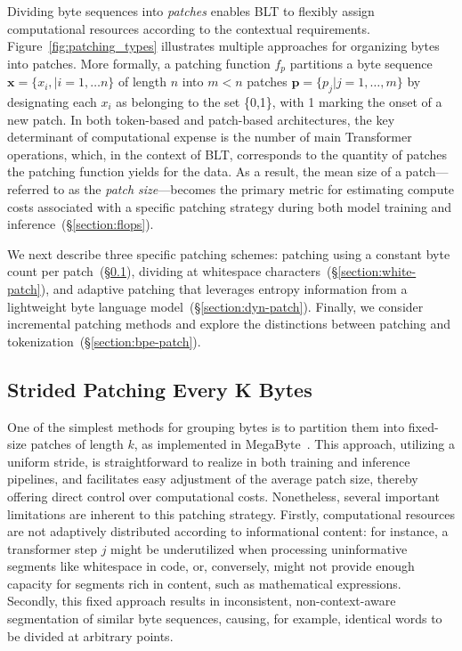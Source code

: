 Dividing byte sequences into \textit{patches} enables {\textsc BLT} to flexibly assign computational resources according to the contextual requirements. Figure~\ref{fig:patching_types} illustrates multiple approaches for organizing bytes into patches. More formally, a patching function $f_p$ partitions a byte sequence $\pmb{x}=\{x_i,|i=1,\ldots n\}$ of length $n$ into $m < n$ patches $\pmb{p}=\{p_j|j=1,\ldots,m\}$ by designating each $x_i$ as belonging to the set \{0,1\}, with 1 marking the onset of a new patch. In both token-based and patch-based architectures, the key determinant of computational expense is the number of main Transformer operations, which, in the context of {\textsc BLT}, corresponds to the quantity of patches the patching function yields for the data. As a result, the mean size of a patch—referred to as the \textit{patch size}—becomes the primary metric for estimating compute costs associated with a specific patching strategy during both model training and inference~(\S\ref{section:flops}). 

We next describe three specific patching schemes: patching using a constant byte count per patch~(\S\ref{section:static-patch}), dividing at whitespace characters~(\S\ref{section:white-patch}), and adaptive patching that leverages entropy information from a lightweight byte language model~(\S\ref{section:dyn-patch}). Finally, we consider incremental patching methods and explore the distinctions between patching and tokenization~(\S\ref{section:bpe-patch}).

\subsection{Strided Patching Every K Bytes}
\label{section:static-patch}

One of the simplest methods for grouping bytes is to partition them into fixed-size patches of length $k$, as implemented in MegaByte~\citep{yu2023megabyte}. This approach, utilizing a uniform stride, is straightforward to realize in both training and inference pipelines, and facilitates easy adjustment of the average patch size, thereby offering direct control over computational costs. Nonetheless, several important limitations are inherent to this patching strategy. Firstly, computational resources are not adaptively distributed according to informational content: for instance, a transformer step $j$ might be underutilized when processing uninformative segments like whitespace in code, or, conversely, might not provide enough capacity for segments rich in content, such as mathematical expressions. Secondly, this fixed approach results in inconsistent, non-context-aware segmentation of similar byte sequences, causing, for example, identical words to be divided at arbitrary points.


